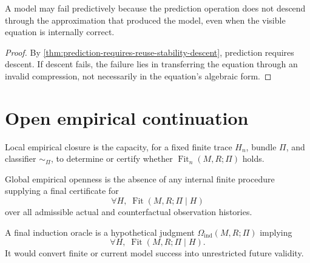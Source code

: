 \begin{corollary}
\label{cor:predictive-failure-non-descent}
A model may fail predictively because the prediction operation does not descend through the approximation that produced the model, even when the visible equation is internally correct.
\end{corollary}

\begin{proof}
By \autoref{thm:prediction-requires-reuse-stability-descent}, prediction requires descent. If descent fails, the failure lies in transferring the equation through an invalid compression, not necessarily in the equation's algebraic form.
\end{proof}


\section{Open empirical continuation}
\label{sec:open-empirical-continuation}

\begin{definition}
\label{def:local-empirical-closure}
Local empirical closure is the capacity, for a fixed finite trace $H_n$, bundle $\Pi$, and classifier $\sim_{\Pi}$, to determine or certify whether $\operatorname{Fit}_n(M,R;\Pi)$ holds.
\end{definition}

\begin{definition}
\label{def:global-empirical-openness}
Global empirical openness is the absence of any internal finite procedure supplying a final certificate for
$$
\forall H,\;
\operatorname{Fit}(M,R;\Pi\mid H)
$$
over all admissible actual and counterfactual observation histories.
\end{definition}

\begin{definition}
\label{def:final-induction-oracle}
A final induction oracle is a hypothetical judgment $\Omega_{\mathrm{ind}}(M,R;\Pi)$ implying
$$
\forall H,\;
\operatorname{Fit}(M,R;\Pi\mid H).
$$
It would convert finite or current model success into unrestricted future validity.
\end{definition}

